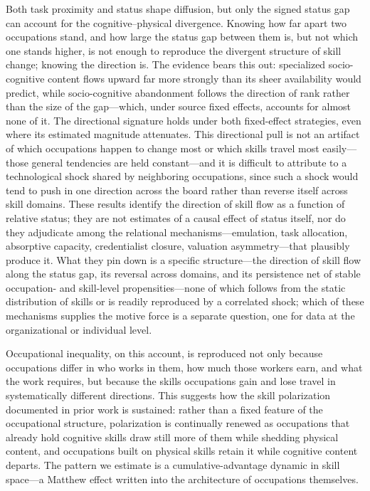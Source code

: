 \documentclass[11pt, letterpaper]{article} %
\newcommand{\parencite}[1]{\cite{#1}}
\begin{document}
Both task proximity and status shape diffusion, but only the signed status gap can account for the cognitive--physical divergence. Knowing how far apart two occupations stand, and how large the status gap between them is, but not which one stands higher, is not enough to reproduce the divergent structure of skill change; knowing the direction is. The evidence bears this out: specialized socio-cognitive content flows upward far more strongly than its sheer availability would predict, while socio-cognitive abandonment follows the direction of rank rather than the size of the gap---which, under source fixed effects, accounts for almost none of it. The directional signature holds under both fixed-effect strategies, even where its estimated magnitude attenuates. This directional pull is not an artifact of which occupations happen to change most or which skills travel most easily---those general tendencies are held constant---and it is difficult to attribute to a technological shock shared by neighboring occupations, since such a shock would tend to push in one direction across the board rather than reverse itself across skill domains. These results identify the direction of skill flow as a function of relative status; they are not estimates of a causal effect of status itself, nor do they adjudicate among the relational mechanisms---emulation, task allocation, absorptive capacity, credentialist closure, valuation asymmetry---that plausibly produce it. What they pin down is a specific structure---the direction of skill flow along the status gap, its reversal across domains, and its persistence net of stable occupation- and skill-level propensities---none of which follows from the static distribution of skills or is readily reproduced by a correlated shock; which of these mechanisms supplies the motive force is a separate question, one for data at the organizational or individual level.

Occupational inequality, on this account, is reproduced not only because occupations differ in who works in them, how much those workers earn, and what the work requires, but because the skills occupations gain and lose travel in systematically different directions. This suggests how the skill polarization documented in prior work \parencite{alabdulkareem_unpacking_2018} is sustained: rather than a fixed feature of the occupational structure, polarization is continually renewed as occupations that already hold cognitive skills draw still more of them while shedding physical content, and occupations built on physical skills retain it while cognitive content departs. The pattern we estimate is a cumulative-advantage dynamic in skill space---a Matthew effect written into the architecture of occupations themselves.
\end{document}
